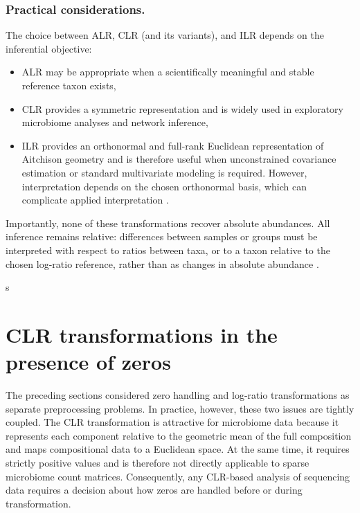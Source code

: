 \subsubsection*{Practical considerations.}

The choice between ALR, CLR (and its variants), and ILR depends on the inferential objective:
\begin{itemize}
    \item ALR may be appropriate when a scientifically meaningful and stable reference taxon exists,
    \item CLR provides a symmetric representation and is widely used in exploratory microbiome analyses and network inference,
    \item ILR provides an orthonormal and full-rank Euclidean representation of Aitchison geometry and is therefore useful when unconstrained covariance estimation or standard multivariate modeling is required. However, interpretation depends on the chosen orthonormal basis, which can complicate applied interpretation \citep{egozcue2003isometric,greenacre2021compositional}.
\end{itemize}

Importantly, none of these transformations recover absolute abundances. All inference remains relative: differences between samples or groups must be interpreted with respect to ratios between taxa, or to a taxon relative to the chosen log-ratio reference, rather than as changes in absolute abundance \citep{quinn2019field}.

s\section{CLR transformations in the presence of zeros}
\label{sec:2micro:clr_with_zeros}

The preceding sections considered zero handling and log-ratio transformations as separate preprocessing problems. In practice, however, these two issues are tightly coupled. The CLR transformation is attractive for microbiome data because it represents each component relative to the geometric mean of the full composition and maps compositional data to a Euclidean space. At the same time, it requires strictly positive values and is therefore not directly applicable to sparse microbiome count matrices. Consequently, any CLR-based analysis of sequencing data requires a decision about how zeros are handled before or during transformation.

